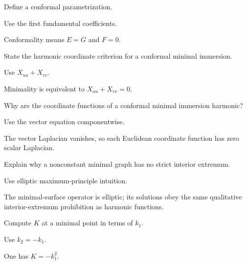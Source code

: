 \begin{exercise}\label{exr:vii19-12}
Define a conformal parametrization.
\end{exercise}
\begin{hint}
Use the first fundamental coefficients.
\end{hint}
\begin{solution}
Conformality means \(E=G\) and \(F=0\).
\end{solution}

\begin{exercise}\label{exr:vii19-13}
State the harmonic coordinate criterion for a conformal minimal immersion.
\end{exercise}
\begin{hint}
Use \(X_{uu}+X_{vv}\).
\end{hint}
\begin{solution}
Minimality is equivalent to \(X_{uu}+X_{vv}=0\).
\end{solution}

\begin{exercise}\label{exr:vii19-14}
Why are the coordinate functions of a conformal minimal immersion harmonic?
\end{exercise}
\begin{hint}
Use the vector equation componentwise.
\end{hint}
\begin{solution}
The vector Laplacian vanishes, so each Euclidean coordinate function has zero scalar Laplacian.
\end{solution}

\begin{exercise}\label{exr:vii19-15}
Explain why a nonconstant minimal graph has no strict interior extremum.
\end{exercise}
\begin{hint}
Use elliptic maximum-principle intuition.
\end{hint}
\begin{solution}
The minimal-surface operator is elliptic; its solutions obey the same qualitative interior-extremum prohibition as harmonic functions.
\end{solution}

\begin{exercise}\label{exr:vii19-16}
Compute \(K\) at a minimal point in terms of \(k_1\).
\end{exercise}
\begin{hint}
Use \(k_2=-k_1\).
\end{hint}
\begin{solution}
One has \(K=-k_1^2\).
\end{solution}

